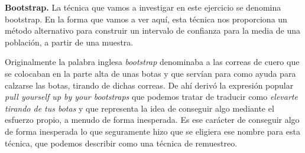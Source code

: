 \documentclass[10pt,a4paper]{article}\usepackage[]{graphicx}\usepackage[]{color}
\begin{document}
\begin{ejercicio}
\label{tut06:ejercicio27}
{\bf Bootstrap.}
La técnica que vamos a investigar en este ejercicio se denomina {\sf bootstrap}. En la forma que vamos a ver aquí, esta técnica nos proporciona un método alternativo para construir un intervalo de confianza para la media de una población, a partir de una muestra.

Originalmente la palabra inglesa {\em bootstrap} denominaba a las correas de cuero que se colocaban en la parte alta de unas botas y que servían para como ayuda para calzarse las botas, tirando de dichas correas. De ahí derivó la expresión popular {\em pull yourself up by your bootstraps} que podemos tratar de traducir como {\em elevarte tirando de tus botas} y que representa la idea de conseguir algo mediante el esfuerzo propio, a menudo de forma inesperada. Es ese carácter de conseguir algo de forma inesperada lo que seguramente hizo que se eligiera ese nombre para esta técnica, que podemos describir como una técnica de remuestreo.


\end{ejercicio}
\end{document}
